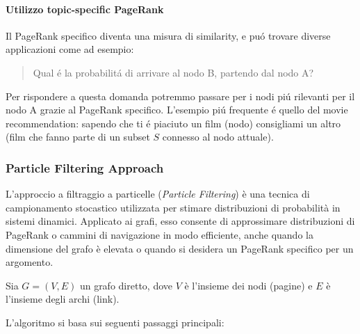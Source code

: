 \paragraph{Utilizzo topic-specific PageRank} Il PageRank specifico diventa una misura di similarity, e puó trovare diverse applicazioni come ad esempio:
\begin{quote}
    Qual é la probabilitá di arrivare al nodo B, partendo dal nodo A? 
\end{quote}
Per rispondere a questa domanda potremmo passare per i nodi piú rilevanti per il nodo A grazie al PageRank specifico. L'esempio piú frequente é quello del movie recommendation: sapendo che ti é piaciuto un film (nodo) consigliami un altro (film che fanno parte di un subset $S$ connesso al nodo attuale).
\newpage
\subsubsection*{Particle Filtering Approach}
L'approccio a filtraggio a particelle (\textit{Particle Filtering}) è una tecnica di campionamento stocastico utilizzata per stimare distribuzioni di probabilità in sistemi dinamici. Applicato ai grafi, esso consente di approssimare distribuzioni di PageRank o cammini di navigazione in modo efficiente, anche quando la dimensione del grafo è elevata o quando si desidera un PageRank specifico per un argomento.

Sia \( G = (V, E) \) un grafo diretto, dove \( V \) è l'insieme dei nodi (pagine) e \( E \) è l'insieme degli archi (link).

L'algoritmo si basa sui seguenti passaggi principali:

